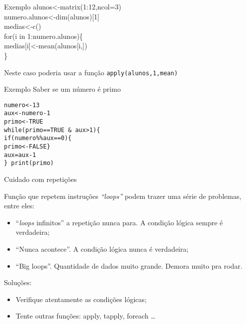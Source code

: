 \documentclass[handout]{beamer}
\begin{document}
\begin{frame}{Exemplo}
alunos<-matrix(1:12,ncol=3)\\
numero.alunos<-dim(alunos)[1]\\
medias<-c()\\
for(i in 1:numero.alunos)\{\\
\hspace{10pt} medias[i]<-mean(alunos[i,])\\
\}

\pause  \vspace{10pt}
Neste caso poderia usar a função \texttt{apply(alunos,1,mean)}
  
\end{frame}

\begin{frame}{Exemplo}
Saber se um número é primo

\texttt{numero<-13\\
aux<-numero-1\\
 primo<-TRUE\\
 while(primo==TRUE \& aux>1)\{\\
 \hspace{30pt}      if(numero\%\%aux==0)\{\\
  \hspace{30pt}\hspace{30pt}     primo<-FALSE\}\\
  \hspace{30pt}     aux=aux-1\\
 \}
 print(primo)
 }  
\end{frame}

\begin{frame}{Cuidado com repetições}

Função que repetem instruções \textit{``loops''} podem trazer uma série de problemas, entre eles:
\begin{itemize}[<+->]
\item ``\textit{loops} infinitos'' a repetição nunca para. A condição lógica sempre é verdadeira;
\item  ``Nunca acontece''. A condição lógica nunca é verdadeira;
\item  ``Big loops''. Quantidade de dados muito grande. Demora muito pra rodar. 
\end{itemize}
\pause
Soluções:\\
\begin{itemize}
\item Verifique atentamente as condições lógicas;
\item Tente outras funções: apply, tapply, foreach \dots \footnotemark{} 
\end{itemize}
  
\end{frame}
\end{document}

